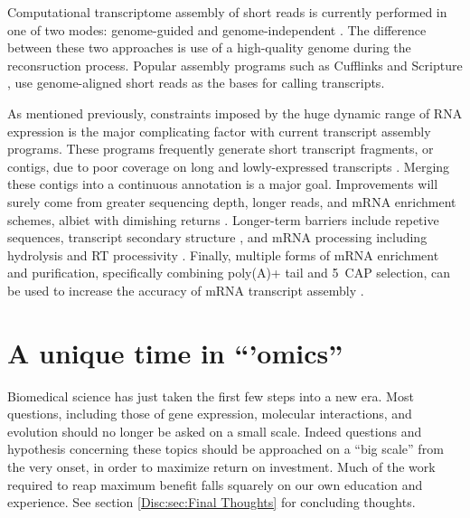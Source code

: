     Computational transcriptome assembly of short reads is currently performed in one of two modes: genome-guided and genome-independent \citep{Garber2011a}. The difference between these two approaches is use of a high-quality genome during the reconsruction process. Popular assembly programs such as Cufflinks \citep{Trapnell2010} and Scripture \citep{Guttman2010}, use genome-aligned short reads as the bases for calling transcripts.

    As mentioned previously, constraints imposed by the huge dynamic range of RNA expression is the major complicating factor with current transcript assembly programs. These programs frequently generate short transcript fragments, or contigs, due to poor coverage on long and lowly-expressed transcripts \citep{Rehrauer2013}. Merging these contigs into a continuous annotation is a major goal. Improvements will surely come from greater sequencing depth, longer reads, and mRNA enrichment schemes, albiet with dimishing returns \citep{Chang2014c}. Longer-term barriers include repetive sequences, transcript secondary structure \citep{Wan2014}, and mRNA processing including hydrolysis and RT processivity \citep{Sharon2013}. Finally, multiple forms of mRNA enrichment and purification, specifically combining poly(A)+ tail and 5\textprime~CAP selection, can be used to increase the accuracy of mRNA transcript assembly \citep{Blower2013}. 

\section{A unique time in ``'omics''}
  \label{Intro:sec:Unique Time in Omics}

  Biomedical science has just taken the first few steps into a new era. Most questions, including those of gene expression, molecular interactions, and evolution should no longer be asked on a small scale. Indeed questions and hypothesis concerning these topics should be approached on a ``big scale'' from the very onset, in order to maximize return on investment. Much of the work required to reap maximum benefit falls squarely on our own education and experience. See section \ref{Disc:sec:Final Thoughts} for concluding thoughts.

\cleardoublepage %
